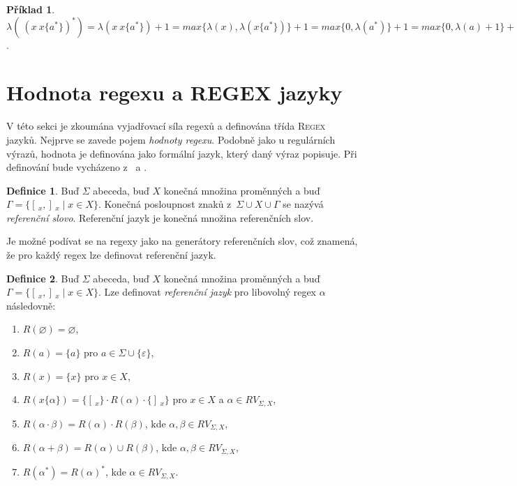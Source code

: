 \documentclass[thesis=B,czech]{FITthesis}[2019/12/23]
\theoremstyle{definition}
\newtheorem{definition}{Definice}[chapter]
\newtheorem{example}{Příklad}[chapter]
\begin{document}
\begin{example}
	$\lambda( \ (x \ x\{a^\ast\})^\ast) = \lambda(x \ x\{a^\ast\})+1=max\{\lambda(x), \lambda(x\{a^\ast\})\}+1=max\{0, \lambda(a^\ast)\}+1=max\{0, \lambda(a)+1\}+1=max\{0, 1\}+1 = 2$.
\end{example}

\section {Hodnota regexu a REGEX jazyky}
V této sekci je zkoumána vyjadřovací síla regexů a definována třída \textsc{Regex} jazyků. Nejprve se zavede pojem \emph{hodnoty regexu}. Podobně jako u regulárních výrazů, hodnota je definována jako formální jazyk, který daný výraz popisuje. Při definování bude vycházeno z~\cite{schmidrefwords} a \cite{fsdeter}.

\begin{definition}
Buď $\Sigma$ abeceda, buď $X$ konečná množina proměnných a buď $\Gamma = \{ [\,_x , ]\,_x \mid x \in X \}$. Konečná posloupnost znaků z~$\Sigma \cup X \cup \Gamma$ se nazývá \emph{referenční slovo}. Referenční jazyk je konečná množina referenčních slov. \cite{schmidrefwords}
\end{definition}

Je možné podívat se na regexy jako na generátory referenčních slov, což znamená, že pro každý regex lze definovat referenční jazyk.

\begin{definition}\label{def:reflan}
Buď $\Sigma$ abeceda, buď $X$ konečná množina proměnných a buď $\Gamma = \{ [\,_x , ]\,_x \mid x \in X \}$. Lze definovat \emph{referenční jazyk} pro libovolný regex $\alpha$ následovně:
\begin{enumerate}
	\item{$R\left(\varnothing\right) = \varnothing$,}
	\item{$R\left(a\right) = \{a\} $ pro $ a \in \Sigma \cup \{ \varepsilon \}$,}
        \item{$R\left(x\right) = \{x\} $ pro $ x \in X$,}
        \item\label{rule:4}{$R\left(x\{ \alpha \}\right) = \{ [\,_x \} \cdot R\left( \alpha \right)  \cdot \{]\,_x \}$ pro $x \in X$ a $\alpha \in RV_{\Sigma, X}$,}
        \item{$R\left(\alpha\cdot\beta\right) = R\left(\alpha\right)\cdot R\left(\beta\right)$, kde $\alpha, \beta \in RV_{\Sigma, X}$,}
        \item{$R\left(\alpha + \beta\right) = R\left(\alpha\right)\cup R\left(\beta\right)$, kde $\alpha, \beta \in RV_{\Sigma, X}$,}
        \item{$R\left(\alpha^\ast\right) = R\left(\alpha\right)^\ast$, kde $\alpha \in RV_{\Sigma, X}$. \cite{fsdeter}}
\end{enumerate}
\end{definition}
\end{document}

